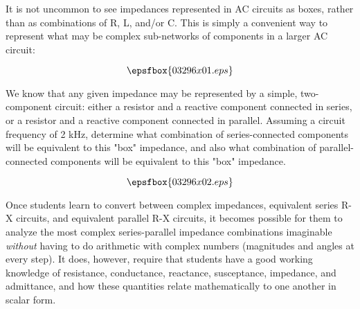

It is not uncommon to see impedances represented in AC circuits as boxes, rather than as combinations of R, L, and/or C.  This is simply a convenient way to represent what may be complex sub-networks of components in a larger AC circuit:

$$\epsfbox{03296x01.eps}$$

We know that any given impedance may be represented by a simple, two-component circuit: either a resistor and a reactive component connected in series, or a resistor and a reactive component connected in parallel.  Assuming a circuit frequency of 2 kHz, determine what combination of series-connected components will be equivalent to this "box" impedance, and also what combination of parallel-connected components will be equivalent to this "box" impedance.







$$\epsfbox{03296x02.eps}$$







Once students learn to convert between complex impedances, equivalent series R-X circuits, and equivalent parallel R-X circuits, it becomes possible for them to analyze the most complex series-parallel impedance combinations imaginable {\it without} having to do arithmetic with complex numbers (magnitudes and angles at every step).  It does, however, require that students have a good working knowledge of resistance, conductance, reactance, susceptance, impedance, and admittance, and how these quantities relate mathematically to one another in scalar form.




